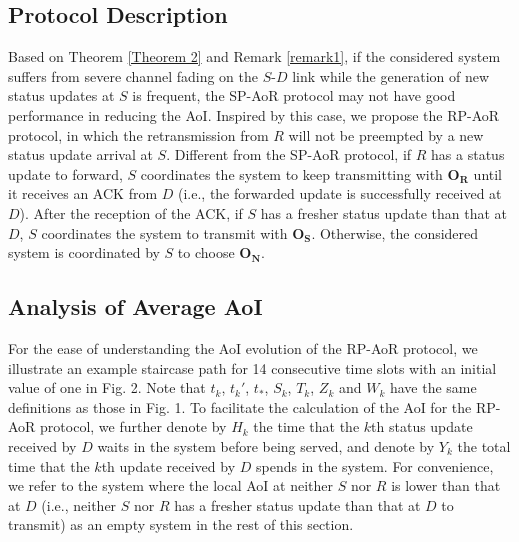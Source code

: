 \documentclass{IEEEtran}
\begin{document}
\vspace{-0.2cm}
\subsection{Protocol Description}
Based on Theorem \ref{Theorem 2} and Remark \ref{remark1}, if the considered system suffers from severe channel fading on the $S$-$D$ link while the generation of new status updates at $S$ is frequent, the SP-AoR protocol may not have good performance in reducing the AoI. Inspired by this case, we propose the RP-AoR protocol, in which the retransmission from $R$ will not be preempted by a new status update arrival at $S$. Different from the SP-AoR protocol, if $R$ has a status update to forward, $S$ coordinates the system to keep transmitting with $\mathbf{O}_{\mathbf{R}}$ until it receives an ACK from $D$ (i.e., the forwarded update is successfully received at $D$). After the reception of the ACK, if $S$ has a fresher status update than that at $D$, $S$ coordinates the system to transmit with $\mathbf{O}_{\mathbf{S}}$. Otherwise, the considered system is coordinated by $S$ to choose $\mathbf{O}_{\mathbf{N}}$.

\vspace{-0.3cm}
\subsection{Analysis of Average AoI}
For the ease of understanding the AoI evolution of the RP-AoR protocol, we illustrate an example staircase path for 14 consecutive time slots with an initial value of one in Fig. 2. Note that $t_k$, $t_k'$, $t_*$, $S_k$, $T_k$, $Z_k$ and $W_k$ have the same definitions as those in Fig. 1. To facilitate the calculation of the AoI for the RP-AoR protocol, we further denote by $H_k$ the time that the $k$th status update received by $D$ waits in the system before being served, and denote by $Y_k$ the total time that the $k$th update received by $D$ spends in the system. For convenience, we refer to the system where the local AoI at neither $S$ nor $R$ is lower than that at $D$ (i.e., neither $S$ nor $R$ has a fresher status update than that at $D$ to transmit) as an empty system in the rest of this section.
	


\end{document}

